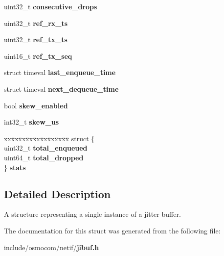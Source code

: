 \begin{DoxyCompactItemize}
\item 
uint32\+\_\+t {\bfseries consecutive\+\_\+drops}\label{structosmo__jibuf_abafe56571f19314044dba6b92ab939c8}

\item 
uint32\+\_\+t {\bfseries ref\+\_\+rx\+\_\+ts}\label{structosmo__jibuf_a296a3fd32920924867ce0c218c762d13}

\item 
uint32\+\_\+t {\bfseries ref\+\_\+tx\+\_\+ts}\label{structosmo__jibuf_ab751169ca0443d09d0c5595c27db2e34}

\item 
uint16\+\_\+t {\bfseries ref\+\_\+tx\+\_\+seq}\label{structosmo__jibuf_a336d60ffca79d944bb4a32b126773fc3}

\item 
struct timeval {\bfseries last\+\_\+enqueue\+\_\+time}\label{structosmo__jibuf_a0fae1b9765ce20a8fba87a8f2288da43}

\item 
struct timeval {\bfseries next\+\_\+dequeue\+\_\+time}\label{structosmo__jibuf_a82e8ec833fe8d0261c09dc20ed396a44}

\item 
bool {\bfseries skew\+\_\+enabled}\label{structosmo__jibuf_a49708521e2673860662f55bb670722a4}

\item 
int32\+\_\+t {\bfseries skew\+\_\+us}\label{structosmo__jibuf_a2d45fd548be21cb8a18f4456a82feece}

\item 
\begin{tabbing}
xx\=xx\=xx\=xx\=xx\=xx\=xx\=xx\=xx\=\kill
struct \{\\
\>uint32\_t {\bfseries total\_enqueued}\\
\>uint64\_t {\bfseries total\_dropped}\\
\} {\bfseries stats}\label{structosmo__jibuf_a3c803a5dfd05ad4d359b733d840a19bc}
\\

\end{tabbing}\end{DoxyCompactItemize}


\subsection{Detailed Description}
A structure representing a single instance of a jitter buffer. 

The documentation for this struct was generated from the following file\+:\begin{DoxyCompactItemize}
\item 
include/osmocom/netif/{\bf jibuf.\+h}\end{DoxyCompactItemize}
